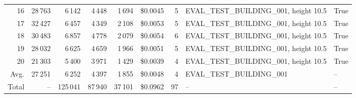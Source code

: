 \documentclass[a4paper,11pt]{article}
\begin{document}
\begin{table}[ht]
\begin{tabular}{r r r r r r r p{3cm} l}
16 & 28\,763 & 6\,142 & 4\,448 & 1\,694 & \$0.0045 & 5 & EVAL\_TEST\_BUILDING\_001, height 10.5 & True \\
17 & 32\,427 & 6\,457 & 4\,349 & 2\,108 & \$0.0053 & 5 & EVAL\_TEST\_BUILDING\_001, height 10.5 & True \\
18 & 30\,483 & 6\,857 & 4\,778 & 2\,079 & \$0.0054 & 6 & EVAL\_TEST\_BUILDING\_001, height 10.5 & True \\
19 & 28\,032 & 6\,625 & 4\,659 & 1\,966 & \$0.0051 & 5 & EVAL\_TEST\_BUILDING\_001, height 10.5 & True \\
20 & 21\,303 & 5\,400 & 3\,971 & 1\,429 & \$0.0039 & 4 & EVAL\_TEST\_BUILDING\_001, height 10.5 & True \\
\hline
Avg. & 27\,251 & 6\,252 & 4\,397 & 1\,855 & \$0.0048 & 4 & EVAL\_TEST\_BUILDING\_001 & -- \\
Total & -- & 125\,041 & 87\,940 & 37\,101 & \$0.0962 & 97 & -- & -- \\
\hline
\end{tabular}
\end{table}

\clearpage
\end{document}
